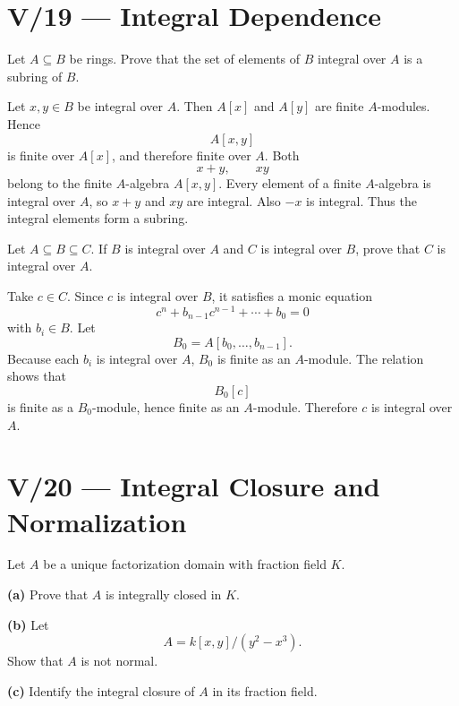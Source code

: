 \section*{V/19 --- Integral Dependence}

\begin{problem}[CP-V-0108]
\label{prob:cp-v-0108}
Let \(A\subseteq B\) be rings. Prove that the set of elements of \(B\) integral over \(A\) is a subring of \(B\).
\end{problem}

\begin{solution}
Let \(x,y\in B\) be integral over \(A\). Then \(A[x]\) and \(A[y]\) are finite \(A\)-modules. Hence
\[
A[x,y]
\]
is finite over \(A[x]\), and therefore finite over \(A\). Both
\[
x+y,\qquad xy
\]
belong to the finite \(A\)-algebra \(A[x,y]\). Every element of a finite \(A\)-algebra is integral over \(A\), so \(x+y\) and \(xy\) are integral. Also \(-x\) is integral. Thus the integral elements form a subring.
\end{solution}


\begin{problem}[CP-V-0109]
\label{prob:cp-v-0109}
Let \(A\subseteq B\subseteq C\). If \(B\) is integral over \(A\) and \(C\) is integral over \(B\), prove that \(C\) is integral over \(A\).
\end{problem}

\begin{solution}
Take \(c\in C\). Since \(c\) is integral over \(B\), it satisfies a monic equation
\[
c^n+b_{n-1}c^{n-1}+\cdots+b_0=0
\]
with \(b_i\in B\). Let
\[
B_0=A[b_0,\dots,b_{n-1}].
\]
Because each \(b_i\) is integral over \(A\), \(B_0\) is finite as an \(A\)-module. The relation shows that
\[
B_0[c]
\]
is finite as a \(B_0\)-module, hence finite as an \(A\)-module. Therefore \(c\) is integral over \(A\).
\end{solution}



\section*{V/20 --- Integral Closure and Normalization}

\begin{problem}[CP-V-0033]
\label{prob:cp-v-0033}
Let \(A\) be a unique factorization domain with fraction field \(K\).

\textbf{(a)} Prove that \(A\) is integrally closed in \(K\).

\textbf{(b)} Let
\[
A=k[x,y]/(y^2-x^3).
\]
Show that \(A\) is not normal.

\textbf{(c)} Identify the integral closure of \(A\) in its fraction field.
\end{problem}

